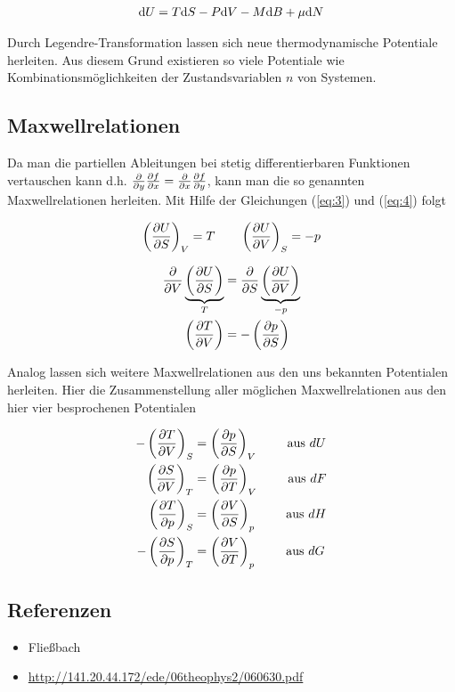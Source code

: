 \begin{align}
  \label{eq:15}
  \diff U = T\diff S - P\diff V - M\diff B + \mu \diff N
\end{align}

Durch Legendre-Transformation lassen sich neue thermodynamische Potentiale herleiten. Aus diesem Grund existieren so viele Potentiale wie Kombinationsmöglichkeiten der Zustandsvariablen \(n\) von Systemen.

\subsection*{Maxwellrelationen}

Da man die partiellen Ableitungen bei stetig differentierbaren Funktionen vertauschen kann d.h. \(\pdiff_y \pdiff f_x = \pdiff_x \pdiff f_y \), kann man die so genannten Maxwellrelationen herleiten. Mit Hilfe der Gleichungen (\ref{eq:3}) und (\ref{eq:4}) folgt

 \begin{align}
  \label{eq:16}
  \left(\pdiff U_S\right)_V = T \qquad   \left(\pdiff U_V\right)_S = -p
\end{align}

\begin{align}
  \label{eq:17}
  \pdiff_V \underbr{\left(\pdiff U_S\right)}_{T} &= \pdiff_S \underbr{\left(\pdiff U_V\right)}_{-p} \\
\left(\pdiff T_V\right) &= -\left(\pdiff p_S\right)
\end{align}

Analog lassen sich weitere Maxwellrelationen aus den uns bekannten Potentialen herleiten. Hier die Zusammenstellung aller möglichen Maxwellrelationen aus den hier vier besprochenen Potentialen

\begin{align}
  \label{eq:18}
  -\left(\pdiff T_V\right)_S &= \left(\pdiff p_S\right)_V \qquad \text{ aus }dU \\
  \left(\pdiff S_V\right)_T &= \left(\pdiff p_T\right)_V \qquad \text{ aus }dF  \\
 \left(\pdiff T_p\right)_S &= \left(\pdiff V_S\right)_p \qquad \text{ aus }dH \\
 - \left(\pdiff S_p\right)_T &= \left(\pdiff V_T\right)_p \qquad \text{ aus }dG 
\end{align}


\subsection*{Referenzen}
\begin{itemize}
\item Fließbach
\item \url{http://141.20.44.172/ede/06theophys2/060630.pdf}
\end{itemize}



